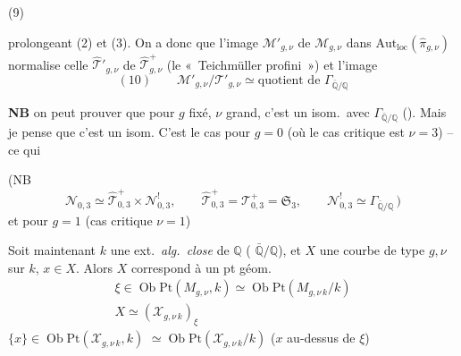 \documentclass[11pt,a4paper]{article}
\begin{document}
(9)


prolongeant (2) et (3). On a donc que l'image $\mathcal{M}'_{g,\nu}$ de
$\mathcal{M}_{g,\nu}$ dans $\mathrm{Aut}_{\mathrm{loc}}(\hat\pi_{g,\nu})$
normalise celle $\hat{\mathcal{T}}'_{g,\nu}$ de
$\hat{\mathcal{T}}^{+}_{g,\nu}$ (le  «~Teichmüller
profini~») et l'image
\[
  (10)\qquad \mathcal{M}'_{g,\nu}/\mathcal{T}'_{g,\nu}
  \simeq \text{quotient de } \Gamma_{\bar{\mathbb{Q}}/\mathbb{Q}}
\]

\textbf{NB} on peut prouver que pour $g$ fixé, $\nu$ grand, c'est un
isom.\ avec $\Gamma_{\bar{\mathbb{Q}}/\mathbb{Q}}$ 
(\uncertain{\ill{}}). Mais je pense que c'est  un
isom. C'est le cas pour $g=0$ (où le cas critique est $\nu=3$) -- ce qui
\struck{\ill{}} 



(NB
\[
  \mathcal{N}_{0,3} \simeq \hat{\mathcal{T}}^{+}_{0,3} \times \mathcal{N}^{!}_{0,3},
  \qquad
  \hat{\mathcal{T}}^{+}_{0,3} = \mathcal{T}^{+}_{0,3} = \mathfrak{S}_3,
  \qquad
  \mathcal{N}^{!}_{0,3} \simeq \Gamma_{\bar{\mathbb{Q}}/\mathbb{Q}}\,)
\]
et pour $g=1$ (cas critique $\nu=1$)


Soit maintenant $k$ une ext.\ \emph{alg.\ close} de $\mathbb{Q}$
(\uncertain{\ill{}} $\bar{\mathbb{Q}}/\mathbb{Q}$), et $X$ une courbe de
type $g,\nu$ sur $k$, $x\in X$. Alors $X$ correspond à un pt géom.
\[
\begin{gathered}
  \xi\in\operatorname{Ob}\mathrm{Pt}(M_{g,\nu},k)
    \simeq\operatorname{Ob}\mathrm{Pt}(M_{g,\nu\,k}/k)\\
  X\simeq(\mathcal{X}_{g,\nu\,k})_\xi
\end{gathered}
\]
\struck{$\xi$,} $\{x\}\in\operatorname{Ob}\mathrm{Pt}(\mathcal{X}_{g,\nu\,k},k)$
${}\simeq\operatorname{Ob}\mathrm{Pt}(\mathcal{X}_{g,\nu\,k}/k)$
($x$ au-dessus de $\xi$)
\end{document}
